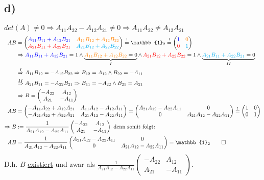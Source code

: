 \documentclass[titlepage]{article}
\newcommand{\1}{\mathbb{1}}
\newcommand{\0}{\mathbb{0}}
\begin{document}
		\subsection*{d)}
			$det(A)\neq0\Rightarrow A_{11}A_{22}-A_{12}A_{21}\neq0\Rightarrow A_{11}A_{22}\neq A_{12}A_{21}$	
			\begin{align*}
				AB&
				=
				\begin{pmatrix}\textcolor{blue}{A_{11}B_{11}+A_{12}B_{21}}&\textcolor{orange}{A_{11}B_{12}+A_{12}B_{22}}\\\textcolor{red}{A_{21}B_{11}+A_{22}B_{21}}&\textcolor{cyan}{A_{21}B_{12}+A_{22}B_{22}}\end{pmatrix}\overset{!}{=}\1_2\overset{!}{=}\begin{pmatrix}\textcolor{blue}{1}&\textcolor{orange}{0}\\\textcolor{red}{0}&\textcolor{cyan}{1}\end{pmatrix}\\
				&\Rightarrow \textcolor{blue}{A_{11}B_{11}+A_{12}B_{21}}=1\wedge \underbrace{\textcolor{orange}{A_{11}B_{12}+A_{12}B_{22}}=0}_I\wedge\, \textcolor{red}{A_{21}B_{12}+A_{22}B_{22}}=1\wedge \underbrace{\textcolor{cyan}{A_{21}B_{11}+A_{22}B_{21}}=0}_{II}\\
				&\overset{I}{\Rightarrow}A_{11}B_{12}=-A_{12}B_{22}\Rightarrow B_{12}=A_{12}\wedge B_{22}=-A_{11}\\
				&\overset{II}{\Rightarrow}A_{21}B_{11}=-A_{22}B_{21}\Rightarrow B_{11}=-A_{22}\wedge B_{21}=A_{21}\\
				&\Rightarrow B=\begin{pmatrix}-A_{22}&A_{12}\\A_{21}&-A_{11}\end{pmatrix}\\
				AB&=\begin{pmatrix}-A_{11}A_{22}+A_{12}A_{21}&A_{11}A_{12}-A_{12}A_{11}\\-A_{21}A_{22}+A_{22}A_{21}&A_{21}A_{12}-A_{22}A_{11}\end{pmatrix}=\begin{pmatrix}A_{21}A_{12}-A_{22}A_{11}&0\\0&A_{21}A_{12}-A_{22}A_{11}\end{pmatrix}\overset{!}{=}\begin{pmatrix}1&0\\0&1\end{pmatrix}\\
				\Rightarrow B&:=\frac{1}{A_{21}A_{12}-A_{22}A_{11}}\begin{pmatrix}-A_{22}&A_{12}\\A_{21}&-A_{11}\end{pmatrix}\text{ denn somit folgt:}\\
				AB&=\frac{1}{A_{21}A_{12}-A_{22}A_{11}}\begin{pmatrix}A_{21}A_{12}-A_{22}A_{11}&0\\0&A_{21}A_{12}-A_{22}A_{11}\end{pmatrix}=\1_2\qed
			\end{align*}
			D.h. $B$ \underline{existiert} und zwar als $\frac{1}{A_{21}A_{12}-A_{22}A_{11}}\begin{pmatrix}-A_{22}&A_{12}\\A_{21}&-A_{11}\end{pmatrix}$.
\end{document}
